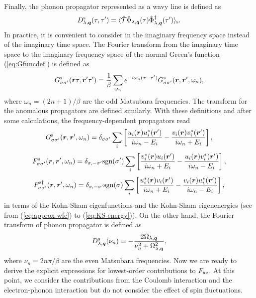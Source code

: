 %
Finally, the phonon propagator represented as a wavy line is defined as 
%
\begin{equation}
	D^{\rm s}_{\lambda,{\bm q}}(\tau,\tau') = \langle \hat{\mathcal T}
	\hat{\Phi}_{\lambda, {\bm q}}(\tau)\hat{\Phi}^\dag_{\lambda, {\bm q}}(\tau')
	\rangle_{\rm s}.
	\label{eq:ph-prop}
\end{equation}
%
In practice, it is convenient to consider in the imaginary frequency space instead of the imaginary time space.
The Fourier transform from the imaginary time space to the imaginary frequency space 
of the normal Green's function (\ref{eq:Gfuncdef}) is defined as
%
\begin{equation}
	G^{\rm s}_{\sigma\sigma'}({\bm r}\tau,{\bm r'}\tau') = \frac{1}{\beta}
	\sum_{\omega_n}e^{-i\omega_n(\tau-\tau')}G^{\rm s}_{\sigma\sigma'}({\bm r},{\bm r'},\omega_n)
	,
	\label{eq:Fouriertrans}
\end{equation}
%
where $\omega_n=(2n+1)/\beta$ are the odd Matsubara frequencies. 
The transform for the anomalous propagators are defined similarly. 
With these definitions and after some calculations, the frequency-dependent propagators read
%
\begin{equation}
	G^{\rm s}_{\sigma\sigma'}({\bm r},{\bm r'},\omega_n) = \delta_{\sigma\sigma'}
	\sum_{i}
	\left[
		\frac{u_i(\bm r)u^\ast_i(\bm r')}{i\omega_n-E_i} - 
		\frac{v_i(\bm r)v^\ast_i(\bm r')}{i\omega_n+E_i}
	\right],
	\label{eq:Gfreq}
\end{equation}
%
\begin{equation}
	F^{\rm s}_{\sigma\sigma'}({\bm r},{\bm r'},\omega_n) = \delta_{\sigma,-\sigma'}{\rm sgn}(\sigma')
	\sum_{i}
	\left[
		\frac{v^\ast_i(\bm r)u_i(\bm r')}{i\omega_n+E_i} - 
		\frac{u_i(\bm r)v^\ast_i(\bm r')}{i\omega_n-E_i}
	\right],
	\label{eq:Ffreq}
\end{equation}
%
\begin{equation}
	F^{\rm s\dag}_{\sigma\sigma'}({\bm r},{\bm r'},\omega_n) = \delta_{\sigma,-\sigma'}{\rm sgn}(\sigma)
	\sum_{i}
	\left[
		\frac{u^\ast_i(\bm r)v_i(\bm r')}{i\omega_n+E_i} - 
		\frac{v_i(\bm r)u^\ast_i(\bm r')}{i\omega_n-E_i}
	\right],
	\label{eq:Fdagfreq}
\end{equation}
%
in terms of the Kohn-Sham eigenfunctions and the Kohn-Sham eigenenergies 
(see from (\ref{eq:approx-wfc}) to (\ref{eq:KS-energy})).
On the other hand, the Fourier transform of phonon propagator is defined as
%
\begin{equation}
	D^{\rm s}_{\lambda, \bm q}(\nu_n) = - \frac{2\Omega_{\lambda, \bm q}}
	{\nu^2_n + \Omega^2_{\lambda, \bm q}},
	\label{eq:phtrans}
\end{equation}
%
where $\nu_n = 2n\pi/\beta$ are the even Matsubara frequencies.
Now we are ready to derive the explicit expressions for lowest-order contributions to $F_{\rm xc}$.
At this point, we consider the contributions from the Coulomb interaction and the electron-phonon interaction
but do not consider the effect of spin fluctuations.

